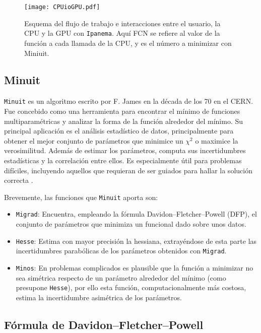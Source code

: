 \begin{figure}[H]
  \centering
  \texttt{[image: CPUioGPU.pdf]}
  \caption{Esquema del flujo de trabajo e interacciones entre el usuario, la CPU y la GPU con \texttt{Ipanema}. Aquí FCN se refiere al valor de la función a cada llamada de la CPU, y es el número a minimizar con Miniuit.} \label{fig:CPUioGPU}
\end{figure}


\subsection{Minuit}

\texttt{Minuit} es un algoritmo escrito por F. James en la década de los 70 en el CERN. Fue concebido como una herramienta para encontrar el mínimo de funciones multiparamétricas y analizar la forma de la función alrededor del mínimo. Su principal aplicación es el análisis estadístico de datos, principalmente para obtener el mejor conjunto de parámetros que minimice un $\chi^2$ o maximice la verosimilitud. Además de estimar los parámetros, computa sus incertidumbres estadísticas y la correlación entre ellos. Es especialmente útil para problemas difíciles, incluyendo aquellos que requieran de ser guiados para hallar la solución correcta 
\cite{James:1975dr}.

Brevemente, las funciones que \texttt{Minuit} aporta son:
\begin{itemize}
  \item \texttt{Migrad}: Encuentra, empleando la fórmula Davidon–Fletcher–Powell (DFP), el conjunto de parámetros que minimiza un funcional dado sobre unos datos.
  \item \texttt{Hesse}: Estima con mayor precisión la hessiana, extrayéndose de esta parte las incertidumbres parabólicas de los parámetros obtenidos con \texttt{Migrad}.   
  \item \texttt{Minos}: En problemas complicados es plausible que la función a minimizar no sea simétrica respecto de un parámetro alrededor del mínimo (como presupone \texttt{Hesse}), por ello esta función, computacionalmente más costosa, estima la incertidumbre asimétrica de los parámetros.
\end{itemize}



\subsection{Fórmula de Davidon–Fletcher–Powell}

